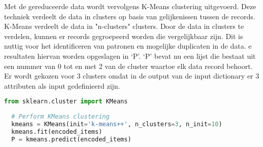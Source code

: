 Met de gereduceerde data wordt vervolgens K-Means clustering uitgevoerd. Deze techniek verdeelt de data in clusters op basis van gelijkenissen tussen de records. K-Means verdeelt de data in "n-clusters" clusters. Door de data in clusters te verdelen, kunnen er records gegroepeerd worden die vergelijkbaar zijn. Dit is nuttig voor het identificeren van patronen en mogelijke duplicaten in de data. e resultaten hiervan worden opgeslagen in ‘P’. ‘P’ bevat nu een lijst die bestaat uit een nummer van 0 tot en met 2 van de cluster waartoe elk data record behoort. Er wordt gekozen voor 3 clusters omdat in de output van de input dictionary er 3 attributen als input gedefinieerd zijn.
\begin{lstlisting}[language=Python, caption={Uitvoeren van K-Means clustering}]
  from sklearn.cluster import KMeans
  
  # Perform KMeans clustering
  kmeans = KMeans(init='k-means++', n_clusters=3, n_init=10)
  kmeans.fit(encoded_items)
  P = kmeans.predict(encoded_items)
\end{lstlisting}  


\section{}%
\label{sec:duplicateeDetectiePOC}

